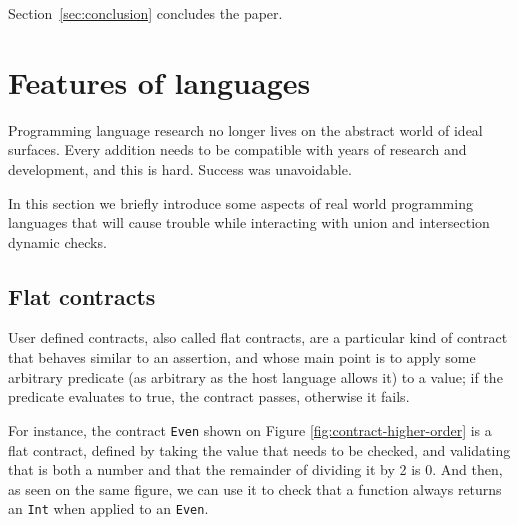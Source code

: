 \documentclass[sigplan,10pt,review,anonymous]{acmart}
\newcommand{\unsure}[2][1=]{}
\newcommand{\info}[2][1=]{}
\newcommand{\nickel}[1]{\lstinline[language=nickel]{#1}}
\begin{document}
Section~\ref{sec:conclusion} concludes the paper.

\newpage

\section{Features of languages}
\label{sec:feat-lang}
\info{Zoology of various features that we will eventually show
  conflict with this or that property or implementation of union and
  intersection. Including user-define contracts.}

Programming language research no longer lives on the abstract world
of ideal surfaces.
Every addition needs to be compatible with years of research
and development, and this is hard.
Success was unavoidable.

In this section we briefly introduce some aspects of real world
programming languages that will cause trouble while interacting
with union and intersection dynamic checks.

\subsection*{Flat contracts}
\label{sec:flat-contracts}

\unsure{Should we define contracts prior to this?}
User defined contracts, also called flat contracts, are a particular
kind of contract that behaves similar to an assertion, and whose
main point is to apply some arbitrary predicate (as arbitrary as the
host language allows it) to a value; if the predicate evaluates to
true, the contract passes, otherwise it fails.

For instance, the contract \nickel{Even} shown on Figure
\ref{fig:contract-higher-order} is a flat contract, defined
by taking the value that needs to be checked, and validating
that is both a number and that the remainder of dividing it by 2
is 0.
And then, as seen on the same figure, we can use it to check that a function always
returns an \nickel{Int} when applied to an \nickel{Even}.

\end{document}
